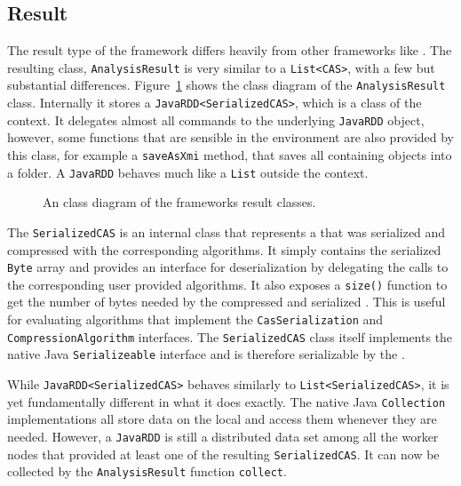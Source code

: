 \subsection{Result}
The result type of the framework differs heavily from other frameworks like \uimaas{}. The resulting class, \lstinline|AnalysisResult| is very similar to a \lstinline|List<CAS>|, with a few but substantial differences. Figure~\ref{fig:sup_results} shows the \uml{} class diagram of the \lstinline|AnalysisResult| class. Internally it stores a \lstinline|JavaRDD<SerializedCAS>|, which is a class of the \spark{} context. It delegates almost all commands to the underlying \lstinline|JavaRDD| object, however, some functions that are sensible in the \uima{} environment are also provided by this class, for example a \lstinline|saveAsXmi| method, that saves all containing \cas{} objects into a folder. A \lstinline|JavaRDD| behaves much like a \lstinline|List| outside the \spark{} context.
\begin{figure}[!htb]
	\centering
	\resizebox{\linewidth}{!}{\footnotesize}
	\caption[An UML class diagram of the frameworks result classes.]{An \uml{} class diagram of the frameworks result classes.}
	\label{fig:sup_results}
\end{figure}
The \lstinline|SerializedCAS| is an internal class that represents a \cas{} that was serialized and compressed with the corresponding algorithms. It simply contains the serialized \lstinline|Byte| array and provides an interface for deserialization by delegating the calls to the corresponding user provided algorithms. It also exposes a \lstinline|size()| function to get the number of bytes needed by the compressed and serialized \cas{}. This is useful for evaluating algorithms that implement the \lstinline|CasSerialization| and \lstinline|CompressionAlgorithm| interfaces. The \lstinline|SerializedCAS| class itself implements the native Java \lstinline|Serializeable| interface and is therefore serializable by the \jvm{}.

While \lstinline|JavaRDD<SerializedCAS>| behaves similarly to \lstinline|List<SerializedCAS>|, it is yet fundamentally different in what it does exactly. The native Java \lstinline|Collection| implementations all store data on the local \jvm{} and access them whenever they are needed. However, a \lstinline|JavaRDD| is still a distributed data set among all the worker nodes that provided at least one of the resulting \lstinline|SerializedCAS|. It can now be collected by the \lstinline|AnalysisResult| function \lstinline|collect|. 

